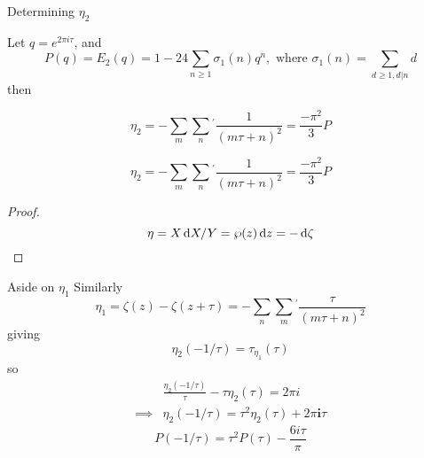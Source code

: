 \begin{frame}{Determining $\eta_2$}

    Let $q = e^{2\pi i \tau}$, and
    \[
        P(q)=E_2(q) =1-
        24 \sum_{n \geq 1} \sigma_{1}(n) q^{n}, \text { where } \sigma_{1}(n)=\sum_{d \geq 1, d | n} d
    \]  then
    \begin{lemma}
        $$
        \eta_{2}=-\sum_{m} \sum_{n}\left.^{\prime}\right. \frac{1}{(m \tau+n)^{2}}=\frac{-\pi^{2}}{3} P
        $$
    \end{lemma}
\end{frame}

\begin{frame}
    \begin{lemma}
        $$
    \eta_{2}=-\sum_{m} \sum_{n}{}^{\prime}\frac{1}{(m \tau+n)^{2}}=\frac{-\pi^{2}}{3} P
        $$
    \end{lemma}
    \begin{proof}
        \[ \eta=X \mathop{}\!\mathrm{d} X / Y=\wp(z) \mathop{}\!\mathrm{d} z = -\mathop{}\!\mathrm{d} \zeta \]
    \end{proof}
\end{frame}

\begin{frame}{Aside on $\eta_1$}
    Similarly
    \[
        \eta_{1}=\zeta(z)-\zeta(z+\tau)=-\sum_{n} \sum_{m}{}^{\prime} \frac{\tau}{(m \tau+n)^{2}}
    \]
    giving
    \[
        \eta_{2}(-1 / \tau)=\tau_{\eta_{1}}(\tau)
    \]
    so
    \[
        \begin{aligned}
&\frac{\eta_{2}(-1 / \tau)}{\tau}-\tau \eta_{2}(\tau)=2 \pi i\\
\implies&\eta_{2}(-1 / \tau)=\tau^{2} \eta_{2}(\tau)+2 \pi \mathbf{i} \tau
        \end{aligned}
    \]
    \[
        P(-1 / \tau)=\tau^{2} P(\tau)-\frac{6i \tau}{\pi}
    \]
\end{frame}

